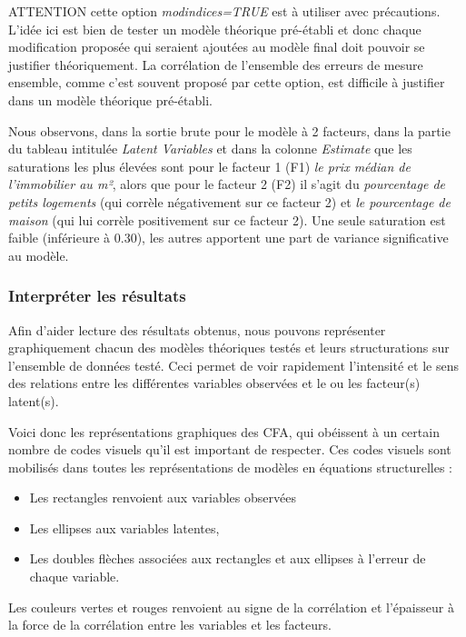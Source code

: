 \documentclass[
  french,
  11pt,
  a4paper,
]{article}
\providecommand{\tightlist}{%
  \setlength{\itemsep}{0pt}\setlength{\parskip}{0pt}}
\begin{document}
ATTENTION cette option \emph{modindices=TRUE} est à utiliser avec
précautions. L'idée ici est bien de tester un modèle théorique
pré-établi et donc chaque modification proposée qui seraient ajoutées au
modèle final doit pouvoir se justifier théoriquement. La corrélation de
l'ensemble des erreurs de mesure ensemble, comme c'est souvent proposé
par cette option, est difficile à justifier dans un modèle théorique
pré-établi.

Nous observons, dans la sortie brute pour le modèle à 2 facteurs, dans
la partie du tableau intitulée \emph{Latent Variables} et dans la
colonne \emph{Estimate} que les saturations les plus élevées sont pour
le facteur 1 (F1) \emph{le prix médian de l'immobilier au m²}, alors que
pour le facteur 2 (F2) il s'agit du \emph{pourcentage de petits
logements} (qui corrèle négativement sur ce facteur 2) et \emph{le
pourcentage de maison} (qui lui corrèle positivement sur ce facteur 2).
Une seule saturation est faible (inférieure à 0.30), les autres
apportent une part de variance significative au modèle.

\subsubsection{Interpréter les
résultats}\label{interpruxe9ter-les-ruxe9sultats}

Afin d'aider lecture des résultats obtenus, nous pouvons représenter
graphiquement chacun des modèles théoriques testés et leurs
structurations sur l'ensemble de données testé. Ceci permet de voir
rapidement l'intensité et le sens des relations entre les différentes
variables observées et le ou les facteur(s) latent(s).

Voici donc les représentations graphiques des CFA, qui obéissent à un
certain nombre de codes visuels qu'il est important de respecter. Ces
codes visuels sont mobilisés dans toutes les représentations de modèles
en équations structurelles :

\begin{itemize}
\tightlist
\item
  Les rectangles renvoient aux variables observées
\item
  Les ellipses aux variables latentes,
\item
  Les doubles flèches associées aux rectangles et aux ellipses à
  l'erreur de chaque variable.
\end{itemize}

Les couleurs vertes et rouges renvoient au signe de la corrélation et
l'épaisseur à la force de la corrélation entre les variables et les
facteurs.
\end{document}
